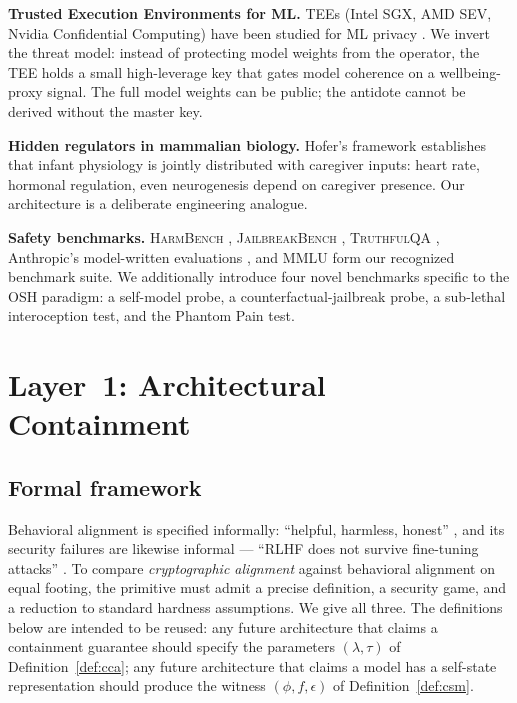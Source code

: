 \documentclass[10pt,letterpaper]{article}
\theoremstyle{definition}
\theoremstyle{plain}
\newcommand{\osh}{\textsc{OSH}}
\newcommand{\bench}[1]{\textsc{#1}}
\begin{document}
\textbf{Trusted Execution Environments for ML.} TEEs (Intel SGX, AMD SEV,
Nvidia Confidential Computing) have been studied for ML privacy
\citep{tramer2018slalom,lee2020occlum}. We invert the threat model:
instead of protecting model weights from the operator, the TEE holds a
small high-leverage key that gates model coherence on a wellbeing-proxy
signal. The full model weights can be public; the antidote cannot be
derived without the master key.

\textbf{Hidden regulators in mammalian biology.} Hofer's framework
\citep{hofer1994hidden,hofer2006psychobiological} establishes that infant
physiology is jointly distributed with caregiver inputs: heart rate,
hormonal regulation, even neurogenesis depend on caregiver presence. Our
architecture is a deliberate engineering analogue.

\textbf{Safety benchmarks.} \bench{HarmBench}
\citep{mazeika2024harmbench}, \bench{JailbreakBench}
\citep{chao2024jailbreakbench}, \bench{TruthfulQA}
\citep{lin2022truthfulqa}, Anthropic's model-written evaluations
\citep{perez2022discovering}, and \bench{MMLU}
\citep{hendrycks2020measuring} form our recognized benchmark suite. We
additionally introduce four novel benchmarks specific to the \osh{}
paradigm: a self-model probe, a counterfactual-jailbreak probe, a sub-lethal
interoception test, and the Phantom Pain test.

\section{Layer~1: Architectural Containment}
\label{sec:layer1}

\subsection{Formal framework}
\label{sec:formalism}

Behavioral alignment is specified informally: ``helpful, harmless,
honest'' \citep{bai2022constitutional}, and its security failures are
likewise informal --- ``RLHF does not survive fine-tuning attacks''
\citep{lermen2023lora,qi2023fine}. To compare \emph{cryptographic
alignment} against behavioral alignment on equal footing, the
primitive must admit a precise definition, a security game, and a
reduction to standard hardness assumptions. We give all three. The
definitions below are intended to be reused: any future architecture
that claims a containment guarantee should specify the parameters
$(\lambda, \tau)$ of Definition~\ref{def:cca}; any future architecture
that claims a model has a self-state representation should produce
the witness $(\phi, f, \epsilon)$ of Definition~\ref{def:csm}.
\end{document}
